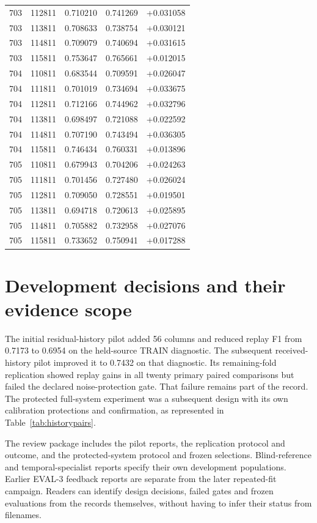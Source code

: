\begin{longtable}{@{}rrrrr@{}}
703 & 112811 & 0.710210 & 0.741269 & +0.031058\\
703 & 113811 & 0.708633 & 0.738754 & +0.030121\\
703 & 114811 & 0.709079 & 0.740694 & +0.031615\\
703 & 115811 & 0.753647 & 0.765661 & +0.012015\\
704 & 110811 & 0.683544 & 0.709591 & +0.026047\\
704 & 111811 & 0.701019 & 0.734694 & +0.033675\\
704 & 112811 & 0.712166 & 0.744962 & +0.032796\\
704 & 113811 & 0.698497 & 0.721088 & +0.022592\\
704 & 114811 & 0.707190 & 0.743494 & +0.036305\\
704 & 115811 & 0.746434 & 0.760331 & +0.013896\\
705 & 110811 & 0.679943 & 0.704206 & +0.024263\\
705 & 111811 & 0.701456 & 0.727480 & +0.026024\\
705 & 112811 & 0.709050 & 0.728551 & +0.019501\\
705 & 113811 & 0.694718 & 0.720613 & +0.025895\\
705 & 114811 & 0.705882 & 0.732958 & +0.027076\\
705 & 115811 & 0.733652 & 0.750941 & +0.017288\\
\bottomrule\end{longtable}

\section{Development decisions and their evidence scope}
The initial residual-history pilot added 56 columns and reduced replay F1 from 0.7173 to 0.6954 on the held-source TRAIN diagnostic. The subsequent received-history pilot improved it to 0.7432 on that diagnostic. Its remaining-fold replication showed replay gains in all twenty primary paired comparisons but failed the declared noise-protection gate. That failure remains part of the record. The protected full-system experiment was a subsequent design with its own calibration protections and confirmation, as represented in Table~\ref{tab:historypairs}.

The review package includes the pilot reports, the replication protocol and outcome, and the protected-system protocol and frozen selections. Blind-reference and temporal-specialist reports specify their own development populations. Earlier EVAL-3 feedback reports are separate from the later repeated-fit campaign. Readers can identify design decisions, failed gates and frozen evaluations from the records themselves, without having to infer their status from filenames.


